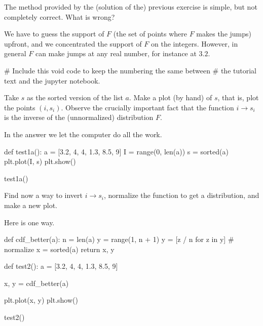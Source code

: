 \begin{exercise}\label{ex:2}
  The method provided by the (solution of the) previous exercise is simple, but not completely correct. What is wrong?
\begin{solution}
  We have to guess the support of $F$ (the set of points where $F$ makes the jumps) upfront, and we concentrated the support of $F$ on the integers.
  However, in general $F$ can make jumps at any real number, for instance at $3.2$.

  \begin{pyverbatim}
    # Include this void code to keep the numbering the same between
    # the tutorial text and the jupyter notebook.
\end{pyverbatim}

\end{solution}
\end{exercise}

\begin{exercise}
  Take $s$ as the sorted version of the list $a$.
  Make a plot (by hand) of $s$, that is, plot the points $(i, s_i)$.
  Observe the crucially important fact that the function $i\to s_i$ is the inverse of the (unnormalized) distribution $F$.
\begin{solution}
    In the answer we let the computer do all the work.

\begin{pyverbatim}
def test1a():
    a = [3.2, 4, 4, 1.3, 8.5, 9]
    I = range(0, len(a))
    s = sorted(a)
    plt.plot(I, s)
    plt.show()

test1a()
\end{pyverbatim}
  \end{solution}
\end{exercise}

\begin{exercise}
  Find now a way to invert $i\to s_i$, normalize the function to get a distribution, and make a new plot.
\begin{solution}
Here is one way.
\begin{pyverbatim}
def cdf_better(a):
    n = len(a)
    y = range(1, n + 1)
    y = [z / n for z in y]  # normalize
    x = sorted(a)
    return x, y


def test2():
    a = [3.2, 4, 4, 1.3, 8.5, 9]

    x, y = cdf_better(a)

    plt.plot(x, y)
    plt.show()

test2()
\end{pyverbatim}


  \end{solution}
\end{exercise}

